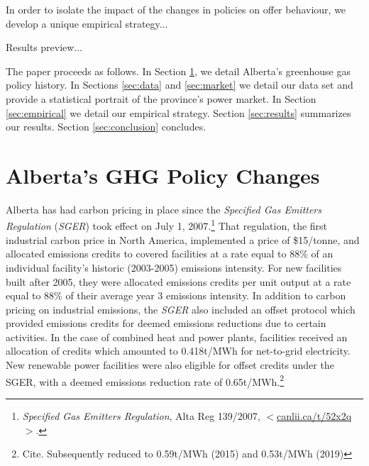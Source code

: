 \documentclass[12pt]{article}
\begin{document}
In order to isolate the impact of the changes in policies on offer behaviour, we develop a unique empirical strategy...

Results preview...

The paper proceeds as follows. In Section \ref{sec:policy}, we detail Alberta's greenhouse gas policy history. In Sections \ref{sec:data} and \ref{sec:market} we detail our data set and provide a statistical portrait of the province's power market. In Section \ref{sec:empirical} we detail our empirical strategy. Section \ref{sec:results} summarizes our results. Section \ref{sec:conclusion} concludes.

\section{Alberta's GHG Policy Changes}\label{sec:policy}

Alberta has had carbon pricing in place since the \emph{Specified Gas Emitters Regulation} (\emph{SGER}) took effect on July 1, 2007.\footnote{\textit{Specified Gas Emitters Regulation}, Alta Reg 139/2007, $<$\url{canlii.ca/t/52x2q}$>$.} That regulation, the first industrial carbon price in North America, implemented a price of \$15/tonne, and allocated emissions credits to covered facilities at a rate equal to 88\% of an individual facility's historic (2003-2005) emissions intensity. For new facilities built after 2005, they were allocated emissions credits per unit output at a rate equal to 88\% of their average year 3 emissions intensity. In addition to carbon pricing on industrial emissions, the \emph{SGER} also included an offset protocol which provided emissions credits for deemed emissions reductions due to certain activities. In the case of combined heat and power plants, facilities received an allocation of credits which amounted to 0.418t/MWh for net-to-grid electricity. New renewable power facilities were also eligible for offset credits under the SGER, with a deemed emissions reduction rate of 0.65t/MWh.\footnote{Cite. Subsequently reduced to 0.59t/MWh (2015) and 0.53t/MWh (2019)}
\end{document}
